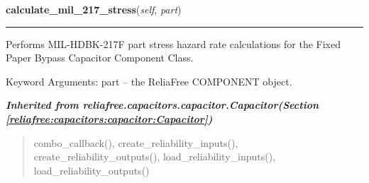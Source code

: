 \hspace{.8\funcindent}\begin{boxedminipage}{\funcwidth}

    \raggedright \textbf{calculate\_mil\_217\_stress}(\textit{self}, \textit{part})

    \vspace{-1.5ex}

    \rule{\textwidth}{0.5\fboxrule}
\setlength{\parskip}{2ex}
    Performs MIL-HDBK-217F part stress hazard rate calculations for the 
    Fixed Paper Bypass Capacitor Component Class.

    Keyword Arguments: part -- the ReliaFree COMPONENT object.

\setlength{\parskip}{1ex}
    \end{boxedminipage}


\large{\textbf{\textit{Inherited from reliafree.capacitors.capacitor.Capacitor\textit{(Section \ref{reliafree:capacitors:capacitor:Capacitor})}}}}

\begin{quote}
combo\_callback(), create\_reliability\_inputs(), create\_reliability\_outputs(), load\_reliability\_inputs(), load\_reliability\_outputs()
\end{quote}
